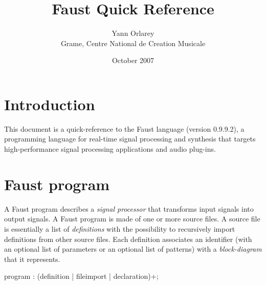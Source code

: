 \documentclass{article}
\begin{document}
\title{Faust Quick Reference}
\author{Yann Orlarey\\Grame, Centre National de Creation Musicale}
\date{October 2007}



\newcommand{\farg}[1]{\textrm{\textit{#1}}}
\newcommand{\ldbrack}{[\![ \,}
\newcommand{\rdbrack}{\, ]\!] }
\newcommand{\rdbrackC}{\rdbrack_{\mathrm{C}}\,}
\newcommand{\dbrack}[1]{\ldbrack #1 \rdbrack}
\newcommand{\semantic}[1]{\ldbrack #1 \rdbrack}
\newcommand{\dbrackC}[1]{\ldbrack #1 \rdbrackC}

\setlength{\parindent}{0pt}
\setlength{\parskip}{1ex plus 0.5ex minus 0.2ex}

\maketitle

\section{Introduction}

This document is a quick-reference to the Faust language (version 0.9.9.2), a programming language for real-time signal processing and synthesis that targets high-performance signal processing applications and audio plug-ins.

\section{Faust program}


A Faust program describes a \emph{signal processor} that transforms input signals into output signals. A Faust program is made of one or more source files. A source file is essentially a list of \emph{definitions} with the possibility to recursively import definitions from other source files. Each definition associates an identifier (with an optional list of parameters or an optional list of patterns) with a \emph{block-diagram} that it represents.

\begin{rail}
program : (definition | fileimport | declaration)+;
\end{rail}
\end{document}
